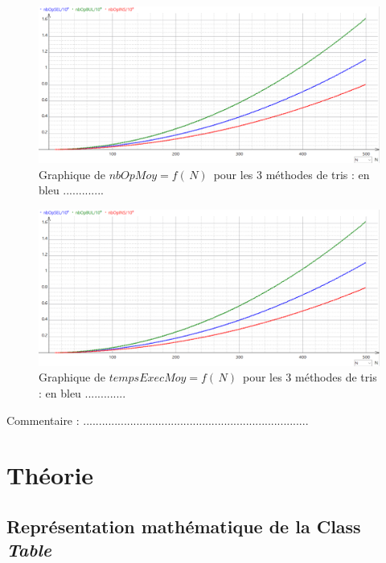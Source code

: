 \documentclass{report}
\begin{document}
\begin{figure}[H]
	\includegraphics[width=\textwidth]{../graphe/graph1.png}
	\caption{Graphique de $nbOpMoy=f(\,N)\,$ pour les 3 méthodes de tris : en bleu .............}
\end{figure}
\begin{figure}[H]
	\includegraphics[width=\textwidth]{../graphe/graph1.png}
	\caption{Graphique de $tempsExecMoy=f(\,N)\,$ pour les 3 méthodes de tris : en bleu .............}
\end{figure}

Commentaire : ........................................................................




\chapter{Théorie}

\section{Représentation mathématique de la Class \it Table}
\end{document}
